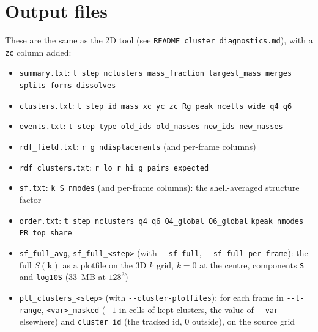 \documentclass[11pt]{article}
\newcommand{\code}[1]{\texttt{#1}}
\begin{document}
\section{Output files}
These are the same as the 2D tool (see \code{README\_cluster\_diagnostics.md}),
with a \code{zc} column added:
\begin{itemize}[nosep]
  \item \code{summary.txt}: \code{t step nclusters mass\_fraction largest\_mass merges splits forms dissolves}
  \item \code{clusters.txt}: \code{t step id mass xc yc zc Rg peak ncells wide q4 q6}
  \item \code{events.txt}: \code{t step type old\_ids old\_masses new\_ids new\_masses}
  \item \code{rdf\_field.txt}: \code{r g ndisplacements} (and per-frame columns)
  \item \code{rdf\_clusters.txt}: \code{r\_lo r\_hi g pairs expected}
  \item \code{sf.txt}: \code{k S nmodes} (and per-frame columns): the shell-averaged structure factor
  \item \code{order.txt}: \code{t step nclusters q4 q6 Q4\_global Q6\_global}
        \code{kpeak nmodes PR top\_share}
  \item \code{sf\_full\_avg}, \code{sf\_full\_<step>} (with \code{-{}-sf-full},
        \code{-{}-sf-full-per-frame}): the full $S(\mathbf k)$ as a plotfile on
        the 3D $k$ grid, $k=0$ at the centre, components \code{S} and
        \code{log10S} (33~MB at $128^3$)
  \item \code{plt\_clusters\_<step>} (with \code{-{}-cluster-plotfiles}): for
        each frame in \code{-{}-t-range}, \code{<var>\_masked} ($-1$ in cells
        of kept clusters, the value of \code{-{}-var} elsewhere) and
        \code{cluster\_id} (the tracked id, 0 outside), on the source grid
\end{itemize}
\end{document}
